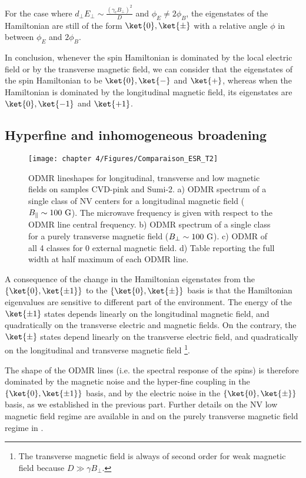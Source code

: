 \documentclass[a4paper, 11pt]{report}
\begin{document}
For the case where $d_\perp E_\perp \sim \frac{(\gamma_e B_\perp)^2}{D}$ and $\phi_E \neq 2\phi_B$, the eigenstates of the Hamiltonian are still of the form $\ket{0},\ket{\pm}$ with a relative angle $\phi$ in between $\phi_E$ and $2\phi_B$.

In conclusion, whenever the spin Hamiltonian is dominated by the local electric field or by the transverse magnetic field, we can consider that the eigenstates of the spin Hamiltonian to be $\ket{0}, \ket{-}$ and $\ket{+}$, whereas when the Hamiltonian is dominated by the longitudinal magnetic field, its eigenstates are $\ket{0}, \ket{-1}$ and $\ket{+1}$.

\subsection{Hyperfine and inhomogeneous broadening}
\label{sec modif T2*}
\begin{figure}[h]
\centering
\texttt{[image: chapter 4/Figures/Comparaison\_ESR\_T2]}
\caption{ODMR lineshapes for longitudinal, transverse and low magnetic fields on samples CVD-pink and Sumi-2. a) ODMR spectrum of a single class of NV centers for a longitudinal magnetic field ($B_\parallel \sim 100\ \rm G$). The microwave frequency is given with respect to the ODMR line central frequency. b) ODMR spectrum of a single class for a purely transverse magnetic field ($B_\perp \sim 100\ \rm G$). c) ODMR of all 4 classes for 0 external magnetic field. d) Table reporting the full width at half maximum of each ODMR line.}
\label{ESR for T2*}
\end{figure}

A consequence of the change in the Hamiltonian eigenstates from the $\{ \ket{0}, \ket{\pm 1} \}$ to the $\{ \ket{0}, \ket{\pm} \}$ basis is that the Hamiltonian eigenvalues are sensitive to different part of the environment. The energy of the $\ket{\pm 1}$ states depends linearly on the longitudinal magnetic field, and quadratically on the transverse electric and magnetic fields. On the contrary, the $\ket{\pm}$ states depend linearly on the transverse electric field, and quadratically on the longitudinal and transverse magnetic field \footnote{The transverse magnetic field is always of second order for weak magnetic field because $D\gg \gamma B_\perp$.}. 

The shape of the ODMR lines (i.e. the spectral response of the spins) is therefore dominated by the magnetic noise and the hyper-fine coupling in the $\{ \ket{0}, \ket{\pm 1} \}$ basis, and by the electric noise in the $\{ \ket{0}, \ket{\pm} \}$ basis, as we established in the previous part. Further details on the NV low magnetic field regime are available in \citep{jamonneau2016competition} and on the purely transverse magnetic field regime in \citep{qiu2021nuclear, qiu2022nanoscale}.
\end{document}
